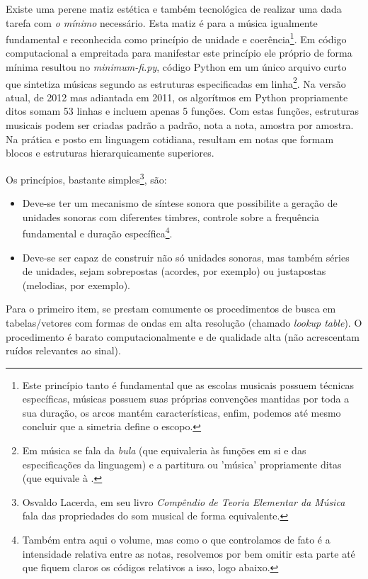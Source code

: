 Existe uma perene matiz estética e também tecnológica de realizar uma
dada tarefa com \emph{o mínimo} necessário.  Esta matiz é para a
música igualmente fundamental e reconhecida como princípio de unidade
e coerência\footnote{Este princípio tanto é fundamental que as escolas
  musicais possuem técnicas específicas, músicas possuem suas próprias
  convenções mantidas por toda a sua duração, os arcos mantém
  características, enfim, podemos até mesmo concluir que a simetria
  define o escopo.}. Em código computacional a empreitada para
manifestar este princípio ele próprio de forma mínima resultou no
\emph{minimum-fi.py}, código Python em um único arquivo curto que
sintetiza músicas segundo as estruturas especificadas em
linha\footnote{Em música se fala da \emph{bula} (que equivaleria às
  funções em si e das especificações da linguagem) e a partitura ou
  'música' propriamente ditas (que equivale à .}.  Na versão atual, de
2012 mas adiantada em 2011, os algorítmos em Python propriamente ditos
somam 53 linhas e incluem apenas 5 funções. Com estas funções,
estruturas musicais podem ser criadas padrão a padrão, nota a nota,
amostra por amostra. Na prática e posto em linguagem cotidiana,
resultam em notas que formam blocos e estruturas hierarquicamente
superiores.

Os princípios, bastante simples\footnote{Osvaldo Lacerda, em seu livro
  \emph{Compêndio de Teoria Elementar da Música} fala das propriedades
  do som musical de forma equivalente.}, são:
\begin{itemize}
  \item Deve-se ter um mecanismo de síntese sonora que possibilite a
    geração de unidades sonoras com diferentes timbres, controle sobre
    a frequência fundamental e duração específica\footnote{Também
      entra aqui o volume, mas como o que controlamos de fato é a
      intensidade relativa entre as notas, resolvemos por bem omitir
      esta parte até que fiquem claros os códigos relativos a isso,
      logo abaixo.}.
  \item Deve-se ser capaz de construir não só unidades sonoras, mas
    também séries de unidades, sejam sobrepostas (acordes, por
    exemplo) ou justapostas (melodias, por exemplo).
\end{itemize}

Para o primeiro item, se prestam comumente os procedimentos de busca
em tabelas/vetores com formas de ondas em alta resolução (chamado
\emph{lookup table}). O procedimento é barato computacionalmente e de
qualidade alta (não acrescentam ruídos relevantes ao sinal).

